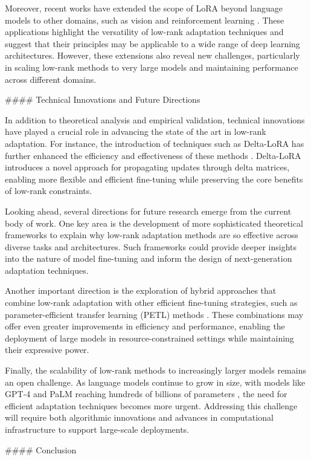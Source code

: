 \documentclass[conference]{IEEEtran}
\begin{document}
Moreover, recent works have extended the scope of LoRA beyond language models to other domains, such as vision and reinforcement learning \cite{bX}. These applications highlight the versatility of low-rank adaptation techniques and suggest that their principles may be applicable to a wide range of deep learning architectures. However, these extensions also reveal new challenges, particularly in scaling low-rank methods to very large models and maintaining performance across different domains.

#### Technical Innovations and Future Directions

In addition to theoretical analysis and empirical validation, technical innovations have played a crucial role in advancing the state of the art in low-rank adaptation. For instance, the introduction of techniques such as Delta-LoRA has further enhanced the efficiency and effectiveness of these methods \cite{bX}. Delta-LoRA introduces a novel approach for propagating updates through delta matrices, enabling more flexible and efficient fine-tuning while preserving the core benefits of low-rank constraints.

Looking ahead, several directions for future research emerge from the current body of work. One key area is the development of more sophisticated theoretical frameworks to explain why low-rank adaptation methods are so effective across diverse tasks and architectures. Such frameworks could provide deeper insights into the nature of model fine-tuning and inform the design of next-generation adaptation techniques.

Another important direction is the exploration of hybrid approaches that combine low-rank adaptation with other efficient fine-tuning strategies, such as parameter-efficient transfer learning (PETL) methods \cite{bX}. These combinations may offer even greater improvements in efficiency and performance, enabling the deployment of large models in resource-constrained settings while maintaining their expressive power.

Finally, the scalability of low-rank methods to increasingly larger models remains an open challenge. As language models continue to grow in size, with models like GPT-4 and PaLM reaching hundreds of billions of parameters \cite{bX}, the need for efficient adaptation techniques becomes more urgent. Addressing this challenge will require both algorithmic innovations and advances in computational infrastructure to support large-scale deployments.

#### Conclusion
\end{document}
